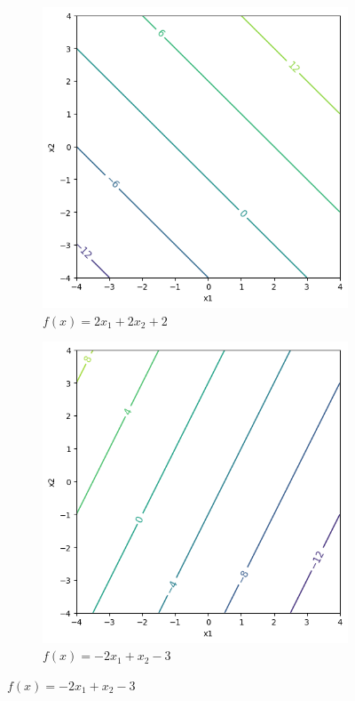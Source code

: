 \documentclass{article}
\theoremstyle{definition}
\theoremstyle{remark}
\theoremstyle{definition}
\begin{document}
\begin{figure}[hbt!]
\begin{subfigure}[b]{0.32\textwidth}
        \includegraphics[width=\textwidth]{scaling2.png} 
        \caption{$f(x) = 2 x_1 + 2 x_2 + 2$} 
        \label{fig:two_times_scaled}
    \end{subfigure} 
    \hfill
    \begin{subfigure}[b]{0.32\textwidth} 
        \centering 
        \includegraphics[width=\textwidth]{scaling3.png} 
        \caption{$f(x) = -2x_1 + x_2 - 3$} 
        \label{fig:something_else}
    \end{subfigure} 


\end{figure}
\end{document}
